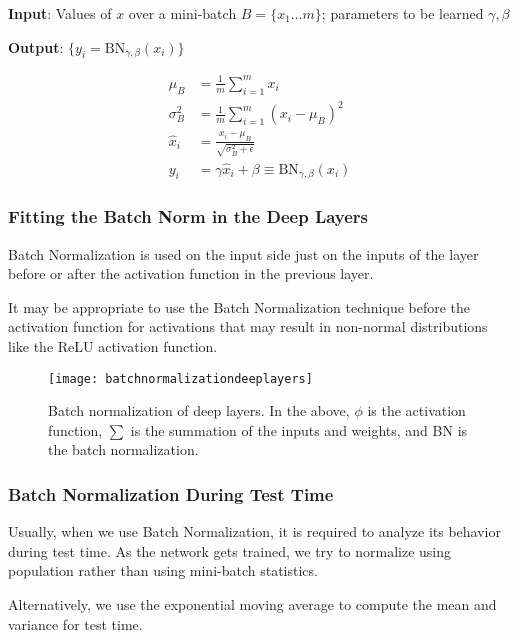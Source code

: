 	\vspace{\baselineskip}
	\begin{plainlist}
		\item {\bfseries Input}: Values of $x$ over a mini-batch $B = \{x_1 \ldots m \}$; parameters to be learned $\gamma, \beta$
		\item {\bfseries Output}: $\{ y_i = \textrm{B}\textrm{N}_{\gamma,\beta} \left(x_i\right) \}$
	\end{plainlist}

	\begin{align}
		\mu_B       &= \frac{1}{m} \sum_{i=1}^m x_i  \\
		\sigma_B^2  &= \frac{1}{m}  \sum_{i=1}^m \left( x_i - \mu_B \right)^2 \\
		\hat{x}_i   &= \frac{x_i - \mu_B}{\sqrt{\sigma_B^2 + \epsilon}}  \\
		y_i         &= \gamma\hat{x}_i + \beta \equiv \textrm{B}\textrm{N}_{\gamma,\beta} \left(x_i\right)
	\end{align}

	\subsubsection{Fitting the Batch Norm in the Deep Layers}
	\begin{bulletedlist}
		\item Batch Normalization is used on the input side just on the inputs of the layer before or after the activation function in the previous layer.
		\item It may be appropriate to use the Batch Normalization technique before the activation function for activations that may result in non-normal distributions like the ReLU activation function.
	\end{bulletedlist}

 	\begin{figure}[h]
		\centering
		\texttt{[image: batchnormalizationdeeplayers]}
		\caption[Batch normalization of deep layers]{Batch normalization of deep layers.  In the above, $\phi$ is the activation function, $\sum$ is the summation of the inputs and weights, and BN is the batch normalization.}
		\label{fig:batchnormalizationdeeplayers}
	\end{figure}

	\subsubsection{Batch Normalization During Test Time}
	\begin{bulletedlist}
		\item Usually, when we use Batch Normalization, it is required to analyze its behavior during test time.  As the network gets trained, we try to normalize using population rather than using mini-batch statistics.
		\item Alternatively, we use the exponential moving average to compute the mean and variance for test time.
	\end{bulletedlist}


